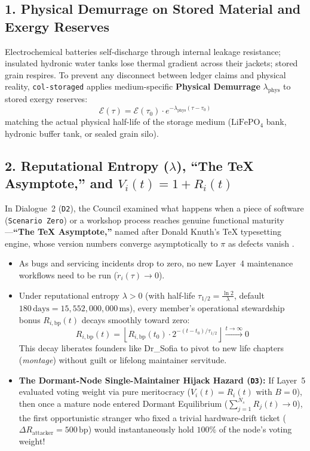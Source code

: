 \subsection{1. Physical Demurrage on Stored Material and Exergy Reserves}
Electrochemical batteries self-discharge through internal leakage resistance; insulated hydronic water tanks lose thermal gradient across their jackets; stored grain respires. To prevent any disconnect between ledger claims and physical reality, \texttt{col-storaged} applies medium-specific \textbf{Physical Demurrage} $\lambda_{\mathrm{phys}}$ to stored exergy reserves:
\begin{equation}
\mathcal{E}(\tau) = \mathcal{E}(\tau_0) \cdot e^{-\lambda_{\mathrm{phys}}(\tau - \tau_0)}
\label{eq:ch5-physical-demurrage}
\end{equation}
matching the actual physical half-life of the storage medium ($\mathrm{LiFePO_4}$ bank, hydronic buffer tank, or sealed grain silo).

\subsection{2. Reputational Entropy ($\lambda$), ``The TeX Asymptote,'' and $V_i(t) = 1 + R_i(t)$}
In Dialogue~2 (\texttt{D2}), the Council examined what happens when a piece of software (\texttt{Scenario Zero}) or a workshop process reaches genuine functional maturity---\textbf{``The \TeX{} Asymptote,''} named after Donald Knuth's \TeX{} typesetting engine, whose version numbers converge asymptotically to $\pi$ as defects vanish \parencite{knuth1984tex}.
\begin{itemize}
    \item As bugs and servicing incidents drop to zero, no new Layer~4 maintenance workflows need to be run ($\dot{r}_i(\tau) \to 0$).
    \item Under reputational entropy $\lambda > 0$ (with half-life $\tau_{1/2} = \frac{\ln 2}{\lambda}$, default $180\,\mathrm{days} = 15{,}552{,}000{,}000\,\mathrm{ms}$), every member's operational stewardship bonus $R_{i,\mathrm{bp}}(t)$ decays smoothly toward zero:
    \begin{equation}
    R_{i,\mathrm{bp}}(t) = \left\lfloor R_{i,\mathrm{bp}}(t_0) \cdot 2^{-(t - t_0)/\tau_{1/2}} \right\rfloor \xrightarrow{t \to \infty} 0
    \label{eq:ch5-reputational-decay}
    \end{equation}
    This decay liberates founders like Dr\_Sofia to pivot to new life chapters (\textit{montage}) without guilt or lifelong maintainer servitude.
    \item \textbf{The Dormant-Node Single-Maintainer Hijack Hazard (\texttt{D3}):} If Layer~5 evaluated voting weight via pure meritocracy ($V_i(t) = R_i(t)$ with $B = 0$), then once a mature node entered Dormant Equilibrium ($\sum_{j=1}^{N_s} R_j(t) \to 0$), the first opportunistic stranger who fixed a trivial hardware-drift ticket ($\Delta R_{\mathrm{attacker}} = 500\,\mathrm{bp}$) would instantaneously hold $100\%$ of the node's voting weight!
\end{itemize}

